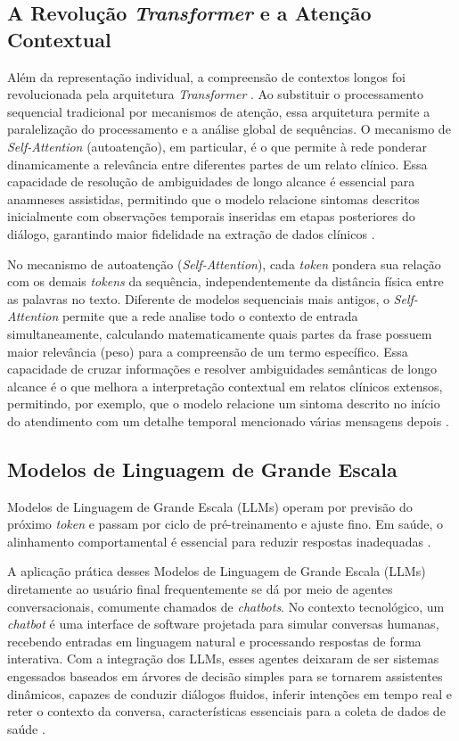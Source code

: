 \subsection{A Revolução \textit{Transformer} e a Atenção Contextual}
Além da representação individual, a compreensão de contextos longos foi revolucionada pela 
arquitetura \textit{Transformer} \cite{vaswani2017}. Ao substituir o processamento sequencial tradicional 
por mecanismos de atenção, essa arquitetura permite a paralelização do processamento e a análise 
global de sequências. O mecanismo de \textit{Self-Attention} (autoatenção), em particular, é o 
que permite à rede ponderar dinamicamente a relevância entre diferentes partes de um relato 
clínico. Essa capacidade de resolução de ambiguidades de longo alcance é essencial para anamneses 
assistidas, permitindo que o modelo relacione sintomas descritos inicialmente com observações 
temporais inseridas em etapas posteriores do diálogo, garantindo maior fidelidade na extração 
de dados clínicos \cite{vaswani2017}.

No mecanismo de autoatenção (\textit{Self-Attention}), cada \textit{token} pondera sua relação com os demais 
\textit{tokens} da sequência, independentemente da distância física entre as palavras no texto. 
Diferente de modelos sequenciais mais antigos, o \textit{Self-Attention} permite que a rede analise 
todo o contexto de entrada simultaneamente, calculando matematicamente quais partes da frase 
possuem maior relevância (peso) para a compreensão de um termo específico. Essa capacidade de 
cruzar informações e resolver ambiguidades semânticas de longo alcance é o que melhora a 
interpretação contextual em relatos clínicos extensos, permitindo, por exemplo, que o modelo 
relacione um sintoma descrito no início do atendimento com um detalhe temporal mencionado 
várias mensagens depois \cite{vaswani2017}.

\subsection{Modelos de Linguagem de Grande Escala}
Modelos de Linguagem de Grande Escala (LLMs) operam por previsão do próximo \textit{token} e passam por ciclo de pré-treinamento e ajuste
fino. Em saúde, o alinhamento comportamental é essencial para reduzir respostas inadequadas
\cite{metaai2024,ouyang2022,singhal2023}.

A aplicação prática desses Modelos de Linguagem de Grande Escala (LLMs) diretamente ao usuário 
final frequentemente se dá por meio de agentes conversacionais, comumente chamados de \textit{chatbots}.
No contexto tecnológico, um \textit{chatbot} é uma interface de software projetada para simular conversas
humanas, recebendo entradas em linguagem natural e processando respostas de forma interativa. 
Com a integração dos LLMs, esses agentes deixaram de ser sistemas engessados baseados em árvores 
de decisão simples para se tornarem assistentes dinâmicos, capazes de conduzir diálogos fluidos, 
inferir intenções em tempo real e reter o contexto da conversa, características essenciais para a 
coleta de dados de saúde \cite{fitzpatrick2017,ouyang2022}.

